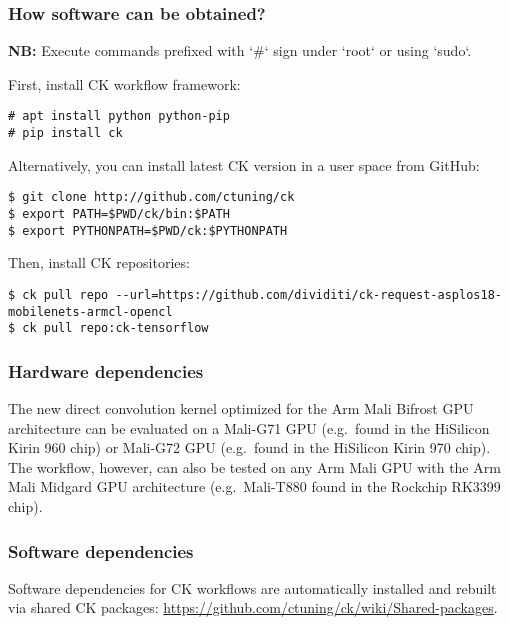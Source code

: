 \subsubsection{How software can be obtained?}

\textbf{NB:} Execute commands prefixed with `\#` sign under `root` or using `sudo`.

First, install CK workflow framework:

\begin{verbatim}
# apt install python python-pip
# pip install ck
\end{verbatim}

Alternatively, you can install latest CK version in a user space from GitHub:
\begin{verbatim}
$ git clone http://github.com/ctuning/ck
$ export PATH=$PWD/ck/bin:$PATH
$ export PYTHONPATH=$PWD/ck:$PYTHONPATH
\end{verbatim}

\noindent Then, install CK repositories:
\begin{verbatim}
$ ck pull repo --url=https://github.com/dividiti/ck-request-asplos18-mobilenets-armcl-opencl
$ ck pull repo:ck-tensorflow
\end{verbatim}

\subsubsection{Hardware dependencies}

The new direct convolution kernel optimized for the Arm Mali Bifrost GPU
architecture can be evaluated on a Mali-G71 GPU (e.g.\ found in the HiSilicon
Kirin 960 chip) or Mali-G72 GPU (e.g.\ found in the HiSilicon Kirin 970 chip).
%
The workflow, however, can also be tested on any Arm Mali GPU with the Arm Mali
Midgard GPU architecture (e.g.\ Mali-T880 found in the Rockchip RK3399 chip).

\subsubsection{Software dependencies}

Software dependencies for CK workflows are automatically installed and rebuilt 
via shared CK packages: \url{https://github.com/ctuning/ck/wiki/Shared-packages}.

